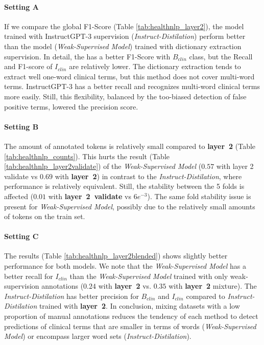 \paragraph{\textbf{Setting A}} If we compare the global F1-Score (Table \ref{tab:healthnlp_layer2}), the model trained with InstructGPT-3 supervision (\textit{Instruct-Distilation}) perform better than the model (\textit{Weak-Supervised Model}) trained 
with dictionary extraction supervision. 
In detail, the has a better F1-Score with $B_{clin}$ class, but the Recall and F1-score of $I_{clin}$ are relatively lower. 
The dictionary extraction tends to extract well one-word clinical terms, but this method does not cover multi-word terms. 
InstructGPT-3 has a better recall and recognizes multi-word clinical terms more easily. Still, this flexibility, balanced by the too-biased detection of false positive terms, lowered the precision score.


\paragraph{\textbf{Setting B}} The amount of annotated tokens is relatively small compared to \textbf{layer~2} (Table \ref{tab:healthnlp_counts}). 
This hurts the result (Table \ref{tab:healthnlp_layer2validate}) of the \textit{Weak-Supervised Model} ($0.57$ with layer 2 validate vs $0.69$ with \textbf{layer~2}) in contrast to the \textit{Instruct-Distilation}, where performance is relatively equivalent. Still, the stability between the 5 folds is affected ($0.01$ with \textbf{layer~2~validate} vs $6e^{-3}$). The same fold stability issue is present for \textit{Weak-Supervised Model}, possibly due to the relatively small amounts of tokens on the train set.


\paragraph{\textbf{Setting C}} The results (Table \ref{tab:healthnlp_layer2blended}) shows slightly better performance for both models. We note that the \textit{Weak-Supervised Model} has a better recall for $I_{clin}$ than the \textit{Weak-Supervised Model} trained with only weak-supervision annotations ($0.24$ with \textbf{layer~2} vs. $0.35$ with \textbf{layer~2} mixture). The \textit{Instruct-Distilation} has better precision for $B_{clin}$ and $I_{clin}$ compared to \textit{Instruct-Distilation} trained with \textbf{layer~2}.   
In conclusion, mixing datasets with a low proportion of manual annotations reduces the tendency of each method to detect predictions of clinical terms that are smaller in terms of words (\textit{Weak-Supervised Model}) or encompass larger word sets (\textit{Instruct-Distilation}). 



